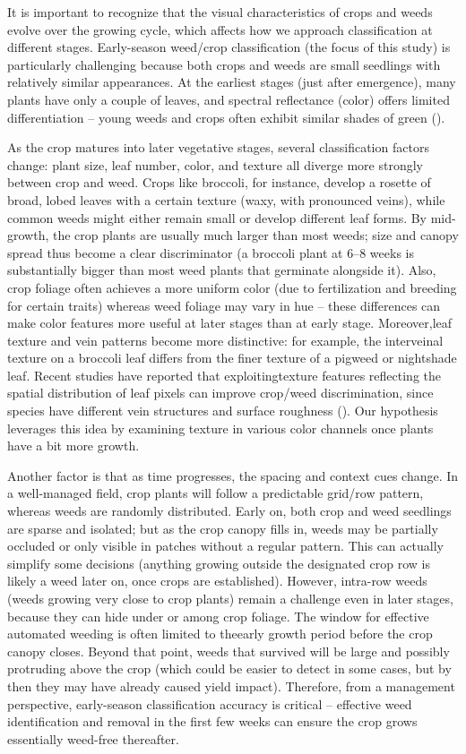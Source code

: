 \documentclass[letterpaper]{report}
\begin{document}
It is important to recognize that the visual characteristics of crops and weeds evolve over the growing cycle, which affects how we approach classification at different stages. Early-season weed/crop classification (the focus of this study) is particularly challenging because both crops and weeds are small seedlings with relatively similar appearances. At the earliest stages (just after emergence), many plants have only a couple of leaves, and spectral reflectance (color) offers limited differentiation – young weeds and crops often exhibit similar shades of green (\cite{Garibaldi-Marquez2022-yn}).

As the crop matures into later vegetative stages, several classification factors change: plant size, leaf number, color, and texture all diverge more strongly between crop and weed. Crops like broccoli, for instance, develop a rosette of broad, lobed leaves with a certain texture (waxy, with pronounced veins), while common weeds might either remain small or develop different leaf forms. By mid-growth, the crop plants are usually much larger than most weeds; size and canopy spread thus become a clear discriminator (a broccoli plant at 6–8 weeks is substantially bigger than most weed plants that germinate alongside it). Also, crop foliage often achieves a more uniform color (due to fertilization and breeding for certain traits) whereas weed foliage may vary in hue – these differences can make color features more useful at later stages than at early stage. Moreover,leaf texture and vein patterns become more distinctive: for example, the interveinal texture on a broccoli leaf differs from the finer texture of a pigweed or nightshade leaf. Recent studies have reported that exploitingtexture features reflecting the spatial distribution of leaf pixels can improve crop/weed discrimination, since species have different vein structures and surface roughness (\cite{Garibaldi-Marquez2022-yn}). Our hypothesis leverages this idea by examining texture in various color channels once plants have a bit more growth.

Another factor is that as time progresses, the spacing and context cues change. In a well-managed field, crop plants will follow a predictable grid/row pattern, whereas weeds are randomly distributed. Early on, both crop and weed seedlings are sparse and isolated; but as the crop canopy fills in, weeds may be partially occluded or only visible in patches without a regular pattern. This can actually simplify some decisions (anything growing outside the designated crop row is likely a weed later on, once crops are established). However, intra-row weeds (weeds growing very close to crop plants) remain a challenge even in later stages, because they can hide under or among crop foliage. The window for effective automated weeding is often limited to theearly growth period before the crop canopy closes. Beyond that point, weeds that survived will be large and possibly protruding above the crop (which could be easier to detect in some cases, but by then they may have already caused yield impact). Therefore, from a management perspective, early-season classification accuracy is critical – effective weed identification and removal in the first few weeks can ensure the crop grows essentially weed-free thereafter.
\end{document}
